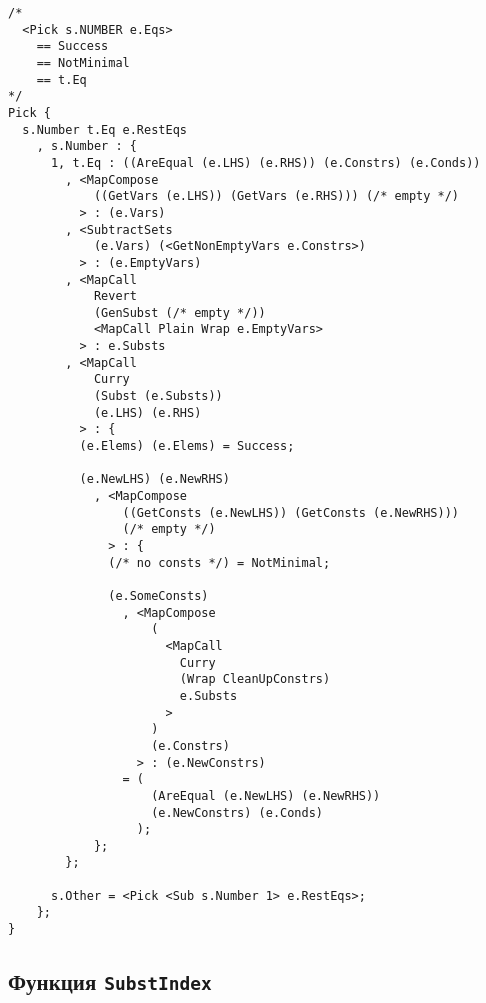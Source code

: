 \documentclass[12pt]{article}
\begin{document}
\begin{verbatim}
/*
  <Pick s.NUMBER e.Eqs>
    == Success
    == NotMinimal
    == t.Eq
*/
Pick {
  s.Number t.Eq e.RestEqs
    , s.Number : {
      1, t.Eq : ((AreEqual (e.LHS) (e.RHS)) (e.Constrs) (e.Conds))
        , <MapCompose
            ((GetVars (e.LHS)) (GetVars (e.RHS))) (/* empty */)
          > : (e.Vars)
        , <SubtractSets
            (e.Vars) (<GetNonEmptyVars e.Constrs>)
          > : (e.EmptyVars)
        , <MapCall
            Revert
            (GenSubst (/* empty */))
            <MapCall Plain Wrap e.EmptyVars>
          > : e.Substs
        , <MapCall
            Curry
            (Subst (e.Substs))
            (e.LHS) (e.RHS)
          > : {
          (e.Elems) (e.Elems) = Success;

          (e.NewLHS) (e.NewRHS)
            , <MapCompose
                ((GetConsts (e.NewLHS)) (GetConsts (e.NewRHS)))
                (/* empty */)
              > : {
              (/* no consts */) = NotMinimal;

              (e.SomeConsts)
                , <MapCompose
                    (
                      <MapCall
                        Curry
                        (Wrap CleanUpConstrs)
                        e.Substs
                      >
                    )
                    (e.Constrs)
                  > : (e.NewConstrs)
                = (
                    (AreEqual (e.NewLHS) (e.NewRHS))
                    (e.NewConstrs) (e.Conds)
                  );
            };
        };

      s.Other = <Pick <Sub s.Number 1> e.RestEqs>;
    };
}
\end{verbatim}


\subsection{Функция \texttt{SubstIndex}}
\end{document}
